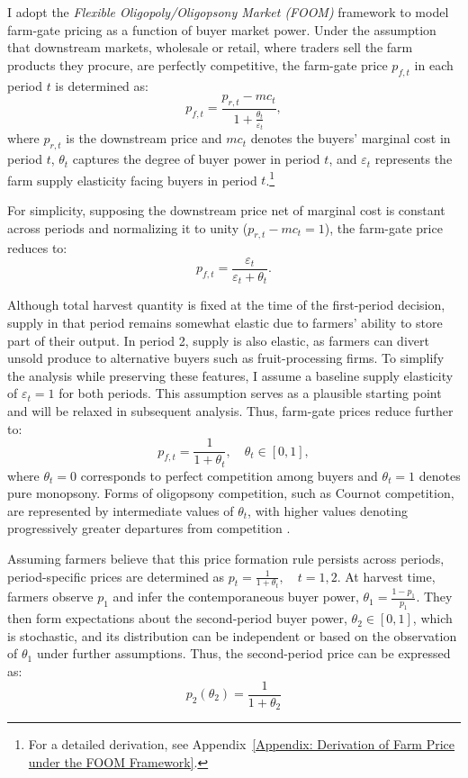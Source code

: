 I adopt the \textit{Flexible Oligopoly/Oligopsony Market (\textit{FOOM})} framework to model farm-gate pricing as a function of buyer market power. Under the assumption that downstream markets, wholesale or retail, where traders sell the farm products they procure, are perfectly competitive, the farm-gate price $p_{f,t}$ in each period $t$ is determined as:
\begin{equation}
p_{f,t} = \frac{p_{r,t} - mc_t}{1 + \frac{\theta_t}{\varepsilon_t}},
\end{equation}
where $p_{r,t}$ is the downstream price and $mc_t$ denotes the buyers' marginal cost in period $t$, $\theta_t$ captures the degree of buyer power in period $t$, and $\varepsilon_t$ represents the farm supply elasticity facing buyers in period $t$.\footnote{For a detailed derivation, see Appendix~\ref{Appendix: Derivation of Farm Price under the FOOM Framework}.}


For simplicity, supposing the downstream price net of marginal cost is constant across periods and normalizing it to unity ($p_{r,t} - mc_t = 1$), the farm-gate price reduces to:
\begin{equation}
p_{f,t} = \frac{\varepsilon_t}{\varepsilon_t + \theta_t}.
\end{equation}


Although total harvest quantity is fixed at the time of the first-period decision, supply in that period remains somewhat elastic due to farmers' ability to store part of their output. In period 2, supply is also elastic, as farmers can divert unsold produce to alternative buyers such as fruit-processing firms. To simplify the analysis while preserving these features, I assume a baseline supply elasticity of $\varepsilon_t = 1$ for both periods. This assumption serves as a plausible starting point and will be relaxed in subsequent analysis. Thus, farm-gate prices reduce further to:
\begin{equation}
p_{f,t} = \frac{1}{1+\theta_t}, \quad \theta_t \in [0,1],
\label{Eq: price formation by buyer power}
\end{equation}
where $\theta_t=0$ corresponds to perfect competition among buyers and $\theta_t=1$ denotes pure monopsony. Forms of oligopsony competition, such as Cournot competition, are represented by intermediate values of $\theta_t$, with higher values denoting progressively greater departures from competition \citep{karp1996dynamic,sexton2001assessment, saitone2009flexible, hamilton2021joint}.

Assuming farmers believe that this price formation rule persists across periods, period-specific prices are determined as $p_t = \frac{1}{1+\theta_t}, \quad t=1,2$. At harvest time, farmers observe $p_1$ and infer the contemporaneous buyer power, $\theta_1 = \frac{1 - p_1}{p_1}$. They then form expectations about the second-period buyer power, $\theta_2 \in [0,1]$, which is stochastic, and its distribution can be independent or based on the observation of $\theta_1$ under further assumptions. Thus, the second-period price can be expressed as:
\begin{equation}
p_2(\theta_2) = \frac{1}{1+\theta_2} 
\label{Eq: p_2 of buyer power change}
\end{equation}


